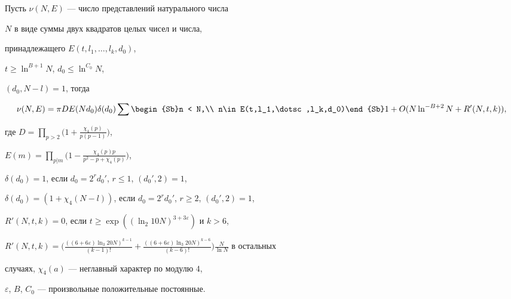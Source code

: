 \begin{thm}


\label{harlit}


Пусть $\nu(N,E)$ --- число представлений натурального числа


$N$ в виде суммы двух квадратов целых чисел и числа,


принадлежащего $E(t,l_1,\dotsc,l_k,d_0)$,


$t \ge \ln^{B+1}N$, $d_0 \le \ln^{C_0}N$,


$(d_0, N-l)=1$, тогда


$$


\nu(N,E)


= \pi D E(N d_0) \delta(d_0)


\sum\begin{Sb}n < N,\\ n\in E(t,l_1,\dotsc,l_k,d_0)\end{Sb}


1+ O ( N \ln^{- B + 2} N + R'(N, t, k)),


$$


где $D = \prod\limits_{p>2} \big( 1 +


\frac{\chi_4(p)}{p(p-1)} \big)$,


$E(m) = \prod\limits_{p|m} \big(1-\frac{\chi_4(p) p}{p^2-p+\chi_4(p)}\big)$,


$\delta(d_0)=1$, если $d_0 = 2^r d_0'$, $r \le 1$, $(d_0',2) =1$,


$\delta(d_0)=(1+\chi_4(N-l))$, если $d_0=2^r d_0'$, $r\ge2$, $(d_0',2)=1$,


$R'(N,t,k)=0$, если $t \ge \exp((\ln_2 10 N)^{3+3\varepsilon})$ и $k>6$,


$R'( N, t, k)= \big( \frac{((6+6 \varepsilon) \ln_3 20N


)^{k-1}}{(k-1)!} + \frac{((6 + 6 \varepsilon) \ln_3 20N


)^{k-6}}{(k-6)!}\big) \frac{N}{\ln N}$ в остальных


случаях, $\chi_4 (a)$ --- неглавный характер по модулю $4$,


$\varepsilon$, $B$, $C_0$ --- произвольные положительные постоянные.


\end{thm}





